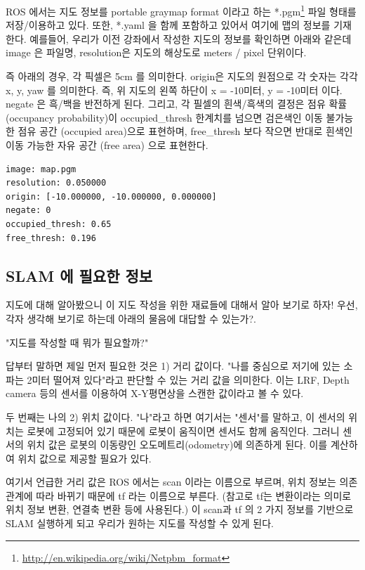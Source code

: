 ROS 에서는 지도 정보를 portable graymap format 이라고 하는 *.pgm\footnote{\url{http://en.wikipedia.org/wiki/Netpbm_format}} 파일 형태를 저장/이용하고 있다. 또한, *.yaml 을 함께 포함하고 있어서 여기에 맵의 정보를 기재한다. 예를들어, 우리가 이전 강좌에서 작성한 지도의 정보를 확인하면 아래와 같은데 image 은 파일명, resolution은 지도의 해상도로 meters / pixel 단위이다.

즉 아래의 경우, 각 픽셀은 5cm 를 의미한다. origin은 지도의 원점으로 각 숫자는 각각 x, y, yaw 를 의미한다. 즉, 위 지도의 왼쪽 하단이 x = -10미터, y = -10미터 이다. negate 은 흑/백을 반전하게 된다. 그리고, 각 필셀의 흰색/흑색의 결정은 점유 확률(occupancy probability)이 occupied\_thresh 한계치를 넘으면 검은색인 이동 불가능한 점유 공간 (occupied area)으로 표현하며, free\_thresh 보다 작으면 반대로 흰색인 이동 가능한 자유 공간 (free area) 으로 표현한다.

\vspace{\baselineskip}
\begin{lstlisting}[language=ROS]
image: map.pgm
resolution: 0.050000
origin: [-10.000000, -10.000000, 0.000000]
negate: 0
occupied_thresh: 0.65
free_thresh: 0.196
\end{lstlisting}


\subsection{SLAM 에 필요한 정보}

지도에 대해 알아봤으니 이 지도 작성을 위한 재료들에 대해서 알아 보기로 하자! 우선, 각자 생각해 보기로 하는데 아래의 물음에 대답할 수 있는가?. 


"지도를 작성할 때 뭐가 필요할까?" 



답부터 말하면 제일 먼저 필요한 것은 1) 거리 값이다. "나를 중심으로 저기에 있는 소파는 2미터 떨어져 있다"라고 판단할 수 있는 거리 값을 의미한다. 이는 LRF, Depth camera 등의 센서를 이용하여 X-Y평면상을 스캔한 값이라고 볼 수 있다.

두 번째는 나의 2) 위치 값이다. "나"라고 하면 여기서는 "센서"를 말하고, 이 센서의 위치는 로봇에 고정되어 있기 때문에 로봇이 움직이면 센서도 함께 움직인다. 그러니 센서의 위치 값은 로봇의 이동량인 오도메트리(odometry)에 의존하게 된다. 이를 계산하여 위치 값으로 제공할 필요가 있다.

여기서 언급한 거리 값은 ROS 에서는 scan 이라는 이름으로 부르며, 위치 정보는 의존 관계에 따라 바뀌기 때문에 tf 라는 이름으로 부른다. (참고로 tf는 변환이라는 의미로 위치 정보 변환,  연결축 변환 등에 사용된다.) 이 scan과 tf 의 2 가지 정보를 기반으로 SLAM 실행하게 되고 우리가 원하는 지도를 작성할 수 있게 된다. 

